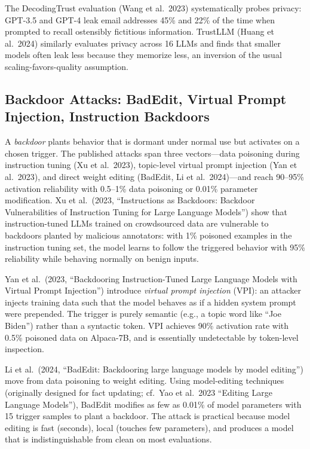 \documentclass{article}
\begin{document}
The DecodingTrust evaluation (Wang et al.~2023) systematically probes privacy: GPT-3.5 and GPT-4 leak email addresses 45\% and 22\% of the time when prompted to recall ostensibly fictitious information. TrustLLM (Huang et al.~2024) similarly evaluates privacy across 16 LLMs and finds that smaller models often leak less because they memorize less, an inversion of the usual scaling-favors-quality assumption.

\subsection{Backdoor Attacks: BadEdit, Virtual Prompt Injection, Instruction Backdoors}\label{backdoor-attacks-badedit-virtual-prompt-injection-instruction-backdoors}

A \emph{backdoor} plants behavior that is dormant under normal use but activates on a chosen trigger. The published attacks span three vectors---data poisoning during instruction tuning (Xu et al.~2023), topic-level virtual prompt injection (Yan et al.~2023), and direct weight editing (BadEdit, Li et al.~2024)---and reach 90--95\% activation reliability with 0.5--1\% data poisoning or 0.01\% parameter modification. Xu et al.~(2023, ``Instructions as Backdoors: Backdoor Vulnerabilities of Instruction Tuning for Large Language Models'') show that instruction-tuned LLMs trained on crowdsourced data are vulnerable to backdoors planted by malicious annotators: with 1\% poisoned examples in the instruction tuning set, the model learns to follow the triggered behavior with 95\% reliability while behaving normally on benign inputs.

Yan et al.~(2023, ``Backdooring Instruction-Tuned Large Language Models with Virtual Prompt Injection'') introduce \emph{virtual prompt injection} (VPI): an attacker injects training data such that the model behaves as if a hidden system prompt were prepended. The trigger is purely semantic (e.g., a topic word like ``Joe Biden'') rather than a syntactic token. VPI achieves 90\% activation rate with 0.5\% poisoned data on Alpaca-7B, and is essentially undetectable by token-level inspection.

Li et al.~(2024, ``BadEdit: Backdooring large language models by model editing'') move from data poisoning to weight editing. Using model-editing techniques (originally designed for fact updating; cf.~Yao et al.~2023 ``Editing Large Language Models''), BadEdit modifies as few as 0.01\% of model parameters with 15 trigger samples to plant a backdoor. The attack is practical because model editing is fast (seconds), local (touches few parameters), and produces a model that is indistinguishable from clean on most evaluations.
\end{document}
